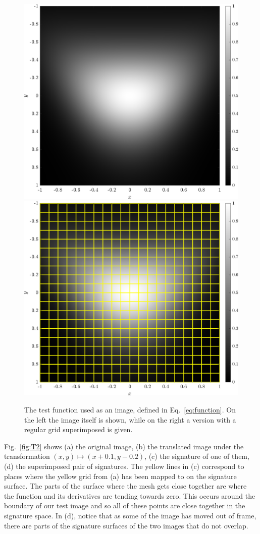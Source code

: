 \documentclass[review,onefignum,onetabnum]{siamonline190516}
\begin{document}
\begin{figure}
  \centering
  \includegraphics[width=.45\textwidth]{Figs/function}
  \includegraphics[width=.45\textwidth]{Figs/function_scanlines}
  \caption{The test function used as an image, defined in Eq.~\eqref{eq:function}.
On the left the image itself is shown, while on the right a version with a
regular grid superimposed is given. 
}\label{fig:function}
\end{figure}

Fig.~\ref{fig:T2} shows (a) the original image, (b) the translated image
under the transformation $(x,y) \mapsto (x + 0.1, y - 0.2)$, (c) the
signature of one of them, (d) the superimposed pair of signatures. The
yellow lines in (c) correspond to places where the yellow grid from (a) has been
mapped to on the signature surface. The parts of the surface where the mesh
gets close together are where the function and its derivatives are tending
towards zero. This occurs around the boundary of our test image and so all
of these points are close together in the signature space. In (d), notice
that as some of the image has moved out of frame, there are parts of the
signature surfaces of the two images that do not overlap.
\end{document}
